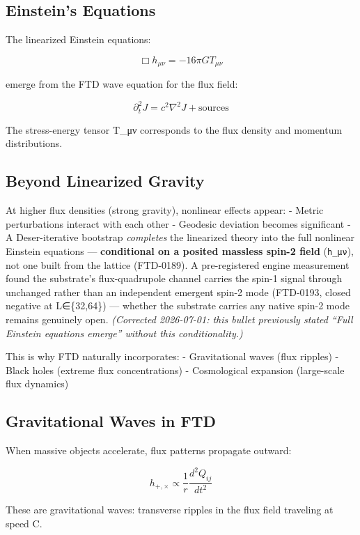 \documentclass[
  11pt,
  letterpaper,
  twoside,
  openright]{book}
\begin{document}
\subsection{Einstein's Equations}\label{einsteins-equations}

The linearized Einstein equations:

\[\Box h_{\mu\nu} = -16\pi G T_{\mu\nu}\]

emerge from the FTD wave equation for the flux field:

\[\partial_t^2 J = c^2 \nabla^2 J + \text{sources}\]

The stress-energy tensor T\_μν corresponds to the flux density and
momentum distributions.

\subsection{Beyond Linearized Gravity}\label{beyond-linearized-gravity}

At higher flux densities (strong gravity), nonlinear effects appear: -
Metric perturbations interact with each other - Geodesic deviation
becomes significant - A Deser-iterative bootstrap \emph{completes} the
linearized theory into the full nonlinear Einstein equations ---
\textbf{conditional on a posited massless spin-2 field}
(\texttt{h\_μν}), not one built from the lattice (FTD-0189). A
pre-registered engine measurement found the substrate's flux-quadrupole
channel carries the spin-1 signal through unchanged rather than an
independent emergent spin-2 mode (FTD-0193, closed negative at
L∈\{32,64\}) --- whether the substrate carries any native spin-2 mode
remains genuinely open. \emph{(Corrected 2026-07-01: this bullet
previously stated ``Full Einstein equations emerge'' without this
conditionality.)}

This is why FTD naturally incorporates: - Gravitational waves (flux
ripples) - Black holes (extreme flux concentrations) - Cosmological
expansion (large-scale flux dynamics)

\subsection{Gravitational Waves in
FTD}\label{gravitational-waves-in-ftd}

When massive objects accelerate, flux patterns propagate outward:

\[h_{+,\times} \propto \frac{1}{r}\frac{d^2Q_{ij}}{dt^2}\]

These are gravitational waves: transverse ripples in the flux field
traveling at speed C.
\end{document}
